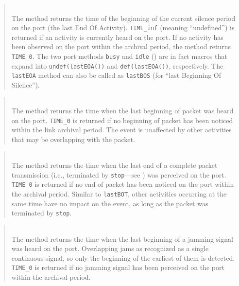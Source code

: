 \begin{quote}
\noindent{}\\ \hspace{0in}
The method returns the time of the beginning of the current silence
period on the port (the last End Of Activity).
{\tt TIME\_inf} (meaning ``undefined'') is returned if an activity is
currently heard on the port. If no activity has been observed on the port
within the archival period, the method returns {\tt TIME\_0}.
The two port methods {\tt busy} and {\tt idle} () are
in fact macros that expand into {\tt undef(lastEOA())}
and
{\tt def(lastEOA())}, respectively.
The {\tt lastEOA} method can also be called as {\tt lastBOS} (for 
``last Beginning Of Silence'').
\end{quote}

\begin{quote}
\noindent{}\\ \hspace{0in}
The method returns the time when the last beginning of packet was
heard on the port.
{\tt TIME\_0} is returned
if no beginning of packet has been noticed within the link archival period.
The event is unaffected by other activities that may be overlapping with
the packet.
\end{quote}

\begin{quote}
\noindent{}\\ \hspace{0in}
The method returns the time when the last end of a complete packet
transmission (i.e., terminated by {\tt stop}---see )
was perceived on the port.
{\tt TIME\_0} is returned if no end of packet has been
noticed on the port within the archival period.
Similar to {\tt lastBOT}, other activities occurring at the same time
have no impact on the event, as long as the packet was terminated by
{\tt stop}.
\end{quote}

\begin{quote}
\noindent{}\\ \hspace{0in}
The method returns the time when the last beginning of a jamming signal
was heard on the port.
Overlapping jams as recognized as a single continuous signal,
so only the beginning of the earliest of them is detected.
{\tt TIME\_0} is returned
if no jamming signal has been perceived on the port within
the archival period.
\end{quote}

